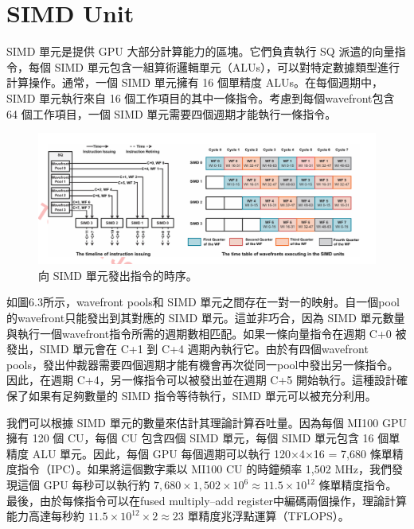\section{SIMD Unit}
SIMD 單元是提供 GPU 大部分計算能力的區塊。它們負責執行 SQ 派遣的向量指令，每個 SIMD 單元包含一組算術邏輯單元（ALUs），可以對特定數據類型進行計算操作。通常，一個 SIMD 單元擁有 16 個單精度 ALUs。在每個週期中，SIMD 單元執行來自 16 個工作項目的其中一條指令。考慮到每個wavefront包含 64 個工作項目，一個 SIMD 單元需要四個週期才能執行一條指令。

\begin{figure}
    \centering
    \includegraphics[width=1\linewidth]{FileAusiliari//Screenshots/Figure6-3.png}
    \caption{向 SIMD 單元發出指令的時序。}
    \label{fig:enter-label}
\end{figure}


\vspace{1em}
如圖6.3所示，wavefront pools和 SIMD 單元之間存在一對一的映射。自一個pool的wavefront只能發出到其對應的 SIMD 單元。這並非巧合，因為 SIMD 單元數量與執行一個wavefront指令所需的週期數相匹配。如果一條向量指令在週期 C+0 被發出，SIMD 單元會在 C+1 到 C+4 週期內執行它。由於有四個wavefront pools，發出仲裁器需要四個週期才能有機會再次從同一pool中發出另一條指令。因此，在週期 C+4，另一條指令可以被發出並在週期 C+5 開始執行。這種設計確保了如果有足夠數量的 SIMD 指令等待執行，SIMD 單元可以被充分利用。

\vspace{1em}
我們可以根據 SIMD 單元的數量來估計其理論計算吞吐量。因為每個 MI100 GPU 擁有 120 個 CU，每個 CU 包含四個 SIMD 單元，每個 SIMD 單元包含 16 個單精度 ALU 單元。因此，每個 GPU 每個週期可以執行 120×4×16 = 7,680 條單精度指令（IPC）。如果將這個數字乘以 MI100 CU 的時鐘頻率 1,502 MHz，我們發現這個 GPU 每秒可以執行約 $7,680 \times 1,502 \times 10^6 \approx 11.5 \times 10^{12}$
 條單精度指令。最後，由於每條指令可以在fused multiply–add register中編碼兩個操作，理論計算能力高達每秒約 $11.5 \times 10^{12} \times 2 \approx 23$ 單精度兆浮點運算（TFLOPS）。


